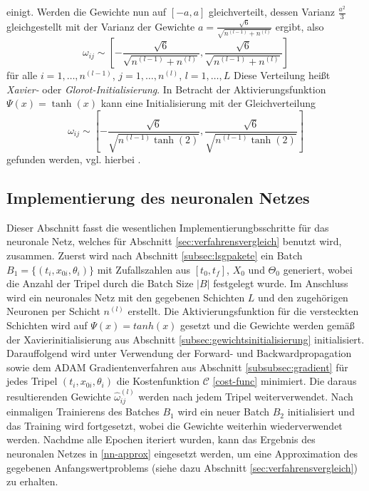 einigt. Werden die Gewichte nun auf $[-a,a]$ gleichverteilt, dessen Varianz $\frac{a^2}{3}$ gleichgestellt mit der
Varianz der Gewichte $a=\frac{\sqrt {6}}{\sqrt {n^{(l-1)} + n^{(l)}}}$ ergibt, also
\[
    \omega_{ij} \sim
    \left[ -\frac{\sqrt {6}}{\sqrt {n^{(l-1)} + n^{(l)}}}, \frac{\sqrt {6}}{\sqrt {n^{(l-1)} + n^{(l)}}} \right]
\]
für alle $i = 1, \dots, n^{(l-1)}$, $j=1,\dots,n^{(l)}$, $l=1,\dots,L$ Diese Verteilung heißt \textit{Xavier-} oder
\textit{Glorot-Initialisierung}. In Betracht der Aktivierungsfunktion $\Psi(x)=\tanh(x)$ kann eine Initialisierung mit der
Gleichverteilung
\[
    \omega_{ij} \sim
    \left[ -\frac{\sqrt {6}}{\sqrt {n^{(l-1)} \tanh(2)}}, \frac{\sqrt {6}}{\sqrt {n^{(l-1)} \tanh(2)}} \right]
\]
gefunden werden, vgl. hierbei \cite[27]{remcovandermeerSolvingPartialDifferential2019}.

\subsection{Implementierung des neuronalen Netzes}
Dieser Abschnitt fasst die wesentlichen Implementierungbsschritte für das neuronale Netz, welches für Abschnitt
\ref{sec:verfahrensvergleich} benutzt wird, zusammen. Zuerst wird nach Abschnitt \ref{subsec:lsgpakete} ein Batch
$B_1=\{(t_i,x_{0i},\theta_i)\}$ mit Zufallszahlen aus $[t_0,t_f]$, $X_0$ und $\Theta_0$ generiert, wobei die Anzahl der
Tripel durch die Batch Size $|B|$ festgelegt wurde. Im Anschluss wird ein neuronales Netz mit den gegebenen Schichten
$L$ und den zugehörigen Neuronen per Schicht $n^{(l)}$ erstellt. Die Aktivierungsfunktion für die versteckten Schichten
wird auf $\Psi(x)=tanh(x)$ gesetzt und die Gewichte werden gemäß der Xavierinitialisierung aus Abschnitt
\ref{subsec:gewichtsinitialisierung} initialisiert. Darauffolgend wird unter Verwendung der Forward- und
Backwardpropagation sowie dem ADAM Gradientenverfahren aus Abschnitt \ref{subsubsec:gradient} für jedes Tripel
$(t_i,x_{0i},\theta_i)$ die Kostenfunktion $\mathcal{C}$ \eqref{cost-func} minimiert. Die daraus resultierenden Gewichte
$\hat{\omega}^{(l)}_{ij}$ werden nach jedem Tripel weiterverwendet. Nach einmaligen Trainierens des Batches $B_1$ wird
ein neuer Batch $B_2$ initialisiert und das Training wird fortgesetzt, wobei die Gewichte weiterhin wiederverwendet
werden. Nachdme alle Epochen iteriert wurden, kann das Ergebnis des neuronalen Netzes in \eqref{nn-approx} eingesetzt
werden, um eine Approximation des gegebenen Anfangswertproblems (siehe dazu Abschnitt \ref{sec:verfahrensvergleich}) zu
erhalten.
